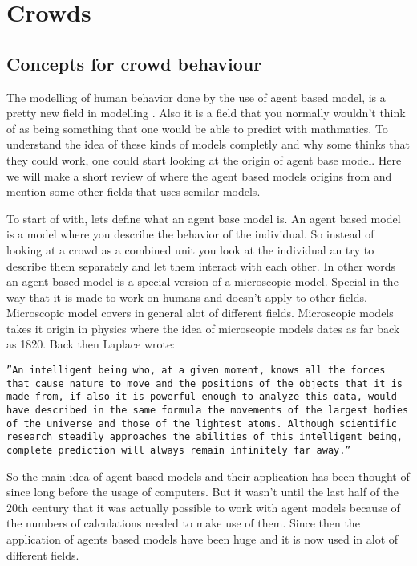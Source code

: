 \section{Crowds}
\label{sec:crowds}
\subsection{Concepts for crowd behaviour}
The modelling of human behavior done by the use of agent based model, is a pretty 
new field in modelling \cite{helbing00}. Also it is a field that you normally wouldn't 
think of as being something that one would be able to predict with mathmatics. To understand 
the idea of these kinds of models completly and why some thinks that they could work, one could 
start looking at the origin of agent base model. Here we will make a short review of where 
the agent based models origins from and mention some other fields that uses semilar models. 

To start of with, lets define what an agent base model is. An agent based model is a model 
where you describe the behavior of the individual. So instead of looking at a crowd as a combined 
unit you look at the individual an try to describe them separately and let them interact with 
each other. In other words an agent based model is a special version of a microscopic model. 
Special in the way that it is made to work on humans and doesn't apply to other fields. Microscopic 
model covers in general alot of different fields. Microscopic models takes it origin in physics where 
the idea of microscopic models dates as far back as 1820. Back then Laplace wrote\cite{simintro}:

\begin{center}
\begin{minipage}[c]{5in}
\texttt{''An intelligent being who, at a given moment,
knows all the forces that cause nature to move and
the positions of the objects that it is made from, if
also it is powerful enough to analyze this data, would
have described in the same formula the movements of
the largest bodies of the universe and those of the
lightest atoms. Although scientific research steadily
approaches the abilities of this intelligent being, complete
prediction will always remain infinitely far away.''}
\end{minipage}
\end{center}

So the main idea of agent based models and their application has been thought of since long before 
the usage of computers. But it wasn't until the last half of the 20th century that it was actually 
possible to work with agent models because of the numbers of calculations needed to make use of them\cite{simintro}. 
Since then the application of agents based models have been huge and it is now used in alot of different fields. 

